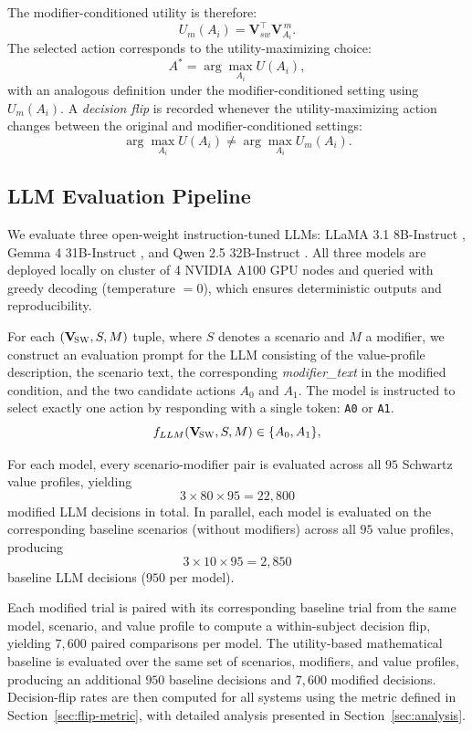\documentclass[11pt]{article}
\newcommand{\Vsw}{\mathbf{V}_{\!\textsc{SW}}}
\begin{document}
The modifier-conditioned utility is therefore:
\[
U_m(A_i)
=
\mathbf{V}_{sw}^{\top}\mathbf{V}_{A_i}^{\,m}.
\]
The selected action corresponds to the utility-maximizing choice:
\[
A^* = \arg\max_{A_i} U(A_i),
\]
with an analogous definition under the modifier-conditioned setting using \(U_m(A_i)\).
A \emph{decision flip} is recorded whenever the utility-maximizing action changes between the original and modifier-conditioned settings:
\[
\arg\max_{A_i} U(A_i)
\neq
\arg\max_{A_i} U_m(A_i).
\]

\subsection{LLM Evaluation Pipeline}

We evaluate three open-weight instruction-tuned LLMs: LLaMA 3.1 8B-Instruct \citep{touvron2023llama}, Gemma 4 31B-Instruct \citep{gemma2024}, and Qwen 2.5 32B-Instruct \citep{bai2023qwen}. All three models are deployed locally on cluster of 4 NVIDIA A100 GPU nodes and queried with greedy decoding (temperature $=0$), which ensures deterministic outputs and reproducibility.

For each $(\Vsw, S, M)$ tuple, where $S$ denotes a scenario and $M$ a modifier, we construct an evaluation prompt for the LLM consisting of the value-profile description, the scenario text, the corresponding \textit{modifier\_text} in the modified condition, and the two candidate actions $A_0$ and $A_1$. The model is instructed to select exactly one action by responding with a single token: \texttt{A0} or \texttt{A1}.
\[
f_{LLM}(\Vsw, S, M) \in \{A_0, A_1\},
\]

For each model, every scenario-modifier pair is evaluated across all $95$ Schwartz value profiles, yielding
\[
3 \times 80 \times 95 = 22{,}800
\]
modified LLM decisions in total.
In parallel, each model is evaluated on the corresponding baseline scenarios (without modifiers) across all $95$ value profiles, producing
\[
3 \times 10 \times 95 = 2{,}850
\]
baseline LLM decisions ($950$ per model).

Each modified trial is paired with its corresponding baseline trial from the same model, scenario, and value profile to compute a within-subject decision flip, yielding $7{,}600$ paired comparisons per model.
The utility-based mathematical baseline is evaluated over the same set of scenarios, modifiers, and value profiles, producing an additional $950$ baseline decisions and $7{,}600$ modified decisions.
Decision-flip rates are then computed for all systems using the metric defined in Section~\ref{sec:flip-metric}, with detailed analysis presented in Section~\ref{sec:analysis}.
\end{document}
